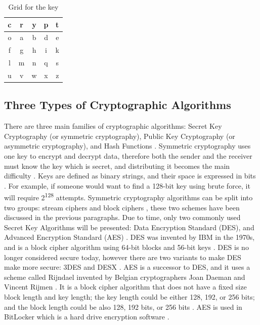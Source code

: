 \documentclass{l4proj}
\begin{document}
    \begin{table}[]
    \centering
    \begin{tabular}{|c|c|c|c|c|}
        \hline
        c & r & y & p & t \\
        \hline
        o & a & b & d & e \\
        \hline
        f & g & h & i & k \\
        \hline
        l & m & n & q & s \\
        \hline
        u & v & w & x & z \\
        \hline
    \end{tabular}
    \caption{Grid for the key}\label{tab:key}
    \end{table}

\subsection{Three Types of Cryptographic Algorithms}

There are three main families of cryptographic algorithms: Secret Key Cryptography (or symmetric cryptography), Public Key Cryptography (or asymmetric cryptography), and
Hash Functions \citep{kessler_overview_2016} \citep{savage_cse_2019}. Symmetric cryptography uses one key to encrypt and decrypt data, therefore both the sender and the 
receiver must know the key which is secret, and distributing it becomes the main difficulty \citep{kessler_overview_2016}. Keys are defined as binary strings, 
and their space is expressed in bits \citep{savage_cse_2019}. 
For example, if someone would want to find a 128-bit key using brute force, it will require 2\textsuperscript{128} attempts. 
Symmetric cryptography algorithms can be split into two groups: stream ciphers and block ciphers \citep{kessler_overview_2016}, 
these two schemes have been discussed in the previous paragraphs. 
Due to time, only two commonly used Secret Key Algorithms will be presented: Data Encryption Standard (DES), and Advanced Encryption Standard (AES) \citep{kessler_overview_2016}. 
DES was invented by IBM in the 1970s, and is a block cipher algorithm using 64-bit blocks and 56-bit keys \citep{kessler_overview_2016}. 
DES is no longer considered secure today, however there are two variants to make DES make more secure: 3DES and DESX \citep{kessler_overview_2016}.
AES is a successor to DES, and it uses a scheme called Rijndael invented by Belgian cryptographers Joan Daeman and Vincent Rijmen \citep{kessler_overview_2016}.
It is a block cipher algorithm that does not have a fixed size block length and key length; the key length could be either 128, 192, or 256 bits;
and the block length could be also 128, 192 bits, or 256 bits \citep{kessler_overview_2016}. AES is used in BitLocker which is a hard drive encryption software \citep{noauthor_bitlocker_2019}.
\end{document}
